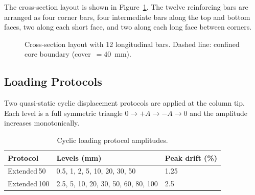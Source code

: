 The cross-section layout is shown in Figure~\ref{fig:v2-cross-section}.
The twelve reinforcing bars are arranged as four corner bars, four
intermediate bars along the top and bottom faces, two along each
short face, and two along each long face between corners.

\begin{figure}[htb]
\centering
{}
\caption{Cross-section layout with 12 longitudinal bars.
  Dashed line: confined core boundary (cover~$=40$~mm).}
\label{fig:v2-cross-section}
\end{figure}

\subsection{Loading Protocols}
\label{ssec:v2-protocols}

Two quasi-static cyclic displacement protocols are applied at the
column tip.  Each level is a full symmetric triangle
$0 \to +A \to -A \to 0$ and the amplitude increases monotonically.

\begin{table}[htbp]
\centering
\caption{Cyclic loading protocol amplitudes.}
\label{tab:v2-protocols}
\begin{tabular}{@{}lll@{}}
\toprule
\textbf{Protocol} & \textbf{Levels (mm)} & \textbf{Peak drift (\%)} \\
\midrule
Extended\,50  & 0.5, 1, 2, 5, 10, 20, 30, 50       & 1.25 \\
Extended\,100 & 2.5, 5, 10, 20, 30, 50, 60, 80, 100 & 2.5  \\
\bottomrule
\end{tabular}
\end{table}

